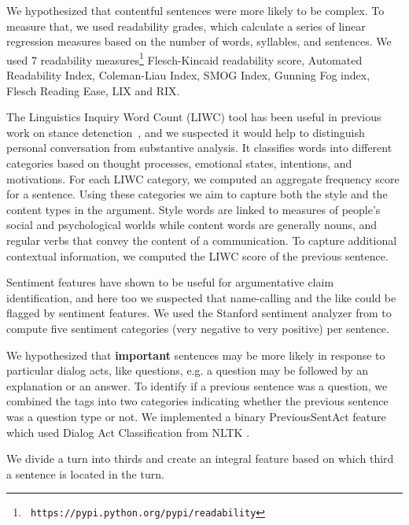\documentclass[11pt]{article}
\begin{document}
 We hypothesized that contentful
sentences were more likely to be complex. To measure that, we used
readability grades, which calculate a series of linear regression
measures based on the number of words, syllables, and sentences. We
used 7 readability measures\footnote{{\small {\tt
      https://pypi.python.org/pypi/readability}}} Flesch-Kincaid
readability score, Automated Readability Index, Coleman-Liau Index,
SMOG Index, Gunning Fog index, Flesch Reading Ease, LIX and RIX.

 The Linguistics Inquiry Word Count (LIWC) tool has been
useful in previous work on stance detenction~\cite{PennebakerFrancis01,SomasundaranWiebe09,HasanNg13}, and we suspected it would help to distinguish personal conversation from substantive analysis.  It classifies words into different categories based on thought processes, emotional states, intentions, and motivations. For each LIWC category, we computed an aggregate frequency score for a sentence. Using these categories we aim to capture both the style and the content types in the argument. Style words are linked to measures of people's social and psychological worlds while content words are generally nouns, and regular verbs that convey the content of a communication. To capture additional contextual information, we computed the LIWC score of the previous sentence.


 Sentiment features have shown to be useful
for argumentative claim identification, and here too we suspected that
name-calling and the like could be flagged by sentiment features. We
used the Stanford sentiment analyzer from \cite{socher2013EMNLP} to
compute five sentiment categories (very negative to very positive) per
sentence.

 We hypothesized
that \textbf{important} sentences may be more likely in response to
particular dialog acts, like questions, e.g. a question may be followed
by an explanation or an answer. To identify if a previous sentence was
a question, we combined the tags into two categories indicating
whether the previous sentence was a question type or not. We
implemented a binary PreviousSentAct feature which used Dialog Act
Classification from NLTK \cite{LoperBird02}.

 We divide a turn into thirds and
create an integral feature based on which third a sentence is located
in the turn.
\end{document}
